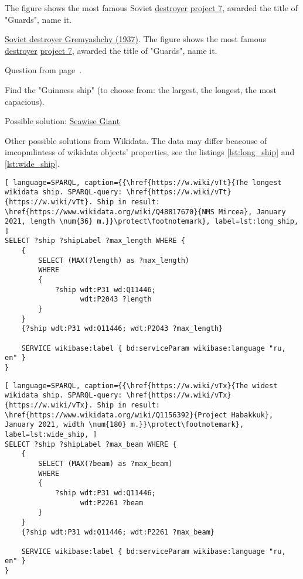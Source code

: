 
\begin{exercise}
	The figure shows the most famous Soviet \href{https://en.wikipedia.org/wiki/Destroyer}{destroyer} \href{https://en.wikipedia.org/wiki/Gnevny-class_destroyer}{project 7}, awarded the title of "Guards", name it.
	\label{answer:ship_1}
	{
		\setlength{\fboxsep}{0pt}%
		\setlength{\fboxrule}{1pt}%
	}
\end{exercise}

\href{https://en.wikipedia.org/wiki/Soviet_destroyer_Gremyashchy_(1937)}{Soviet destroyer Gremyashchy (1937)}.
\label{answer:ship_1}
The figure shows the most famous \href{https://en.wikipedia.org/wiki/Destroyer}{destroyer} \href{https://en.wikipedia.org/wiki/Gnevny-class_destroyer}{project 7}, awarded the title of "Guards", name it.
{
	\setlength{\fboxsep}{0pt}%
	\setlength{\fboxrule}{1pt}%
}

Question from page~\pageref{question:ship_1}.


\begin{exercise}
	\label{answer:ship_ex_1}
	Find the "Guinness ship" (to choose from: the largest, the longest, the most capacious).
\end{exercise}

Possible solution: \href{https://en.wikipedia.org/wiki/Seawise_Giant}{Seawise Giant}

Other possible solutions from Wikidata. The data may differ beacouse of imcopmlintess of wikidata objects' properties, see the listings \ref{lst:long_ship} and \ref{lst:wide_ship}.
\begin{lstlisting}[ language=SPARQL, caption={{\href{https://w.wiki/vTt}{The longest wikidata ship. SPARQL-query: \href{https://w.wiki/vTt}{https://w.wiki/vTt}. Ship in result: \href{https://www.wikidata.org/wiki/Q48817670}{NMS Mircea}, January 2021, length \num{36} m.}}\protect\footnotemark}, label=lst:long_ship, ]
SELECT ?ship ?shipLabel ?max_length WHERE {
	{
		SELECT (MAX(?length) as ?max_length)
		WHERE
		{
			?ship wdt:P31 wd:Q11446;
				  wdt:P2043 ?length
		}
	}
	{?ship wdt:P31 wd:Q11446; wdt:P2043 ?max_length}
			
	SERVICE wikibase:label { bd:serviceParam wikibase:language "ru, en" }
}  
\end{lstlisting}

\begin{lstlisting}[ language=SPARQL, caption={{\href{https://w.wiki/vTx}{The widest wikidata ship. SPARQL-query: \href{https://w.wiki/vTx}{https://w.wiki/vTx}. Ship in result: \href{https://www.wikidata.org/wiki/Q1156392}{Project Habakkuk}, January 2021, width \num{180} m.}}\protect\footnotemark}, label=lst:wide_ship, ]
SELECT ?ship ?shipLabel ?max_beam WHERE {
	{
		SELECT (MAX(?beam) as ?max_beam)
		WHERE
		{
			?ship wdt:P31 wd:Q11446;
				  wdt:P2261 ?beam
		}
	}
	{?ship wdt:P31 wd:Q11446; wdt:P2261 ?max_beam}
			
	SERVICE wikibase:label { bd:serviceParam wikibase:language "ru, en" }
}
\end{lstlisting}

